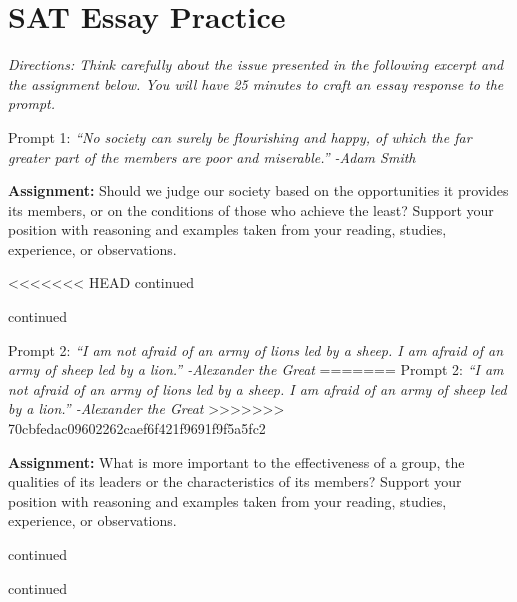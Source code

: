\section{SAT Essay Practice}
\textit{Directions: Think carefully about the issue presented in the following excerpt and the assignment
below. You will have 25 minutes to craft an essay response to the prompt.}

\medskip
Prompt 1: \textit{``No society can surely be flourishing and happy, of which the far greater part of the members are poor and miserable.'' -Adam Smith}

\medskip
\textbf{Assignment:} Should we judge our society based on the opportunities it provides its members, or on the conditions of those who achieve the least? Support your position with reasoning and examples taken from your reading, studies, experience, or observations.

\bigskip
\mline[14]

\newpage
<<<<<<< HEAD
continued \mline[16]

\newpage
continued \mline[16]

\newpage
\large{Prompt 2:} \textit{``I am not afraid of an army of lions led by a sheep. I am afraid of an army of sheep led by a lion.'' -Alexander the Great}
=======
Prompt 2: \textit{``I am not afraid of an army of lions led by a sheep. I am afraid of an army of sheep led by a lion.'' -Alexander the Great}
>>>>>>> 70cbfedac09602262caef6f421f9691f9f5a5fc2

\medskip
\textbf{Assignment:} What is more important to the effectiveness of a group, the qualities of its leaders or the characteristics of its members? Support your position with reasoning and examples taken from your reading, studies, experience, or observations.

\bigskip
\mline[16]

\newpage
continued \mline[16]

\newpage
continued \mline[16]
